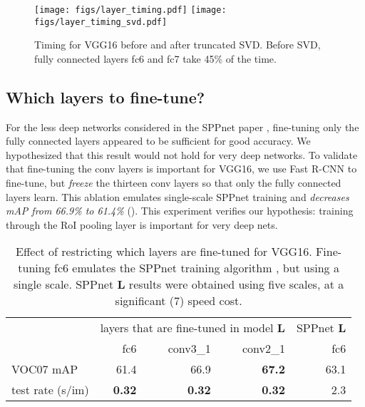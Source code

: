 \documentclass[10pt,twocolumn,letterpaper]{article}
\newcommand{\X}{\xspace}
\newcommand{\vggsixteen}{VGG16\xspace}
\newcommand{\roi}{RoI\xspace}
\newcommand{\Lg}{{\bf L}\xspace}
\begin{document}
\begin{figure}[h!]
\centering
\texttt{[image: figs/layer\_timing.pdf]}
\texttt{[image: figs/layer\_timing\_svd.pdf]}
\caption{Timing for \vggsixteen before and after truncated SVD.
Before SVD, fully connected layers fc6 and fc7 take 45\% of the time.}
\end{figure}



\subsection{Which layers to fine-tune?}
For the less deep networks considered in the SPPnet paper \cite{he2014spp}, fine-tuning only the fully connected layers appeared to be sufficient for good accuracy.
We hypothesized that this result would not hold for very deep networks.
To validate that fine-tuning the conv layers is important for \vggsixteen, we use Fast R-CNN to fine-tune, but \emph{freeze} the thirteen conv layers so that only the fully connected layers learn.
This ablation emulates single-scale SPPnet training and \emph{decreases mAP from 66.9\% to 61.4\%} ().
This experiment verifies our hypothesis: training through the \roi pooling layer is important for very deep nets.

\begin{table}[h!]
\begin{center}
\setlength{\tabcolsep}{3pt}
\renewcommand{\arraystretch}{1.1}
\small
\begin{tabular}{l|rrr|r}
  & \multicolumn{3}{c|}{layers that are fine-tuned in model \Lg} & SPPnet \Lg \\
  &  fc6 &  conv3\_1 &  conv2\_1 &  fc6 \\
\hline
VOC07 mAP & 61.4 & 66.9 & \bf{67.2} & 63.1 \\
test rate (s/im) & \bf{0.32} & \bf{0.32} & \bf{0.32} & 2.3 \\
\end{tabular}
\end{center}
\caption{Effect of restricting which layers are fine-tuned for \vggsixteen.
Fine-tuning  fc6 emulates the SPPnet training algorithm \cite{he2014spp}, but using a single scale.
SPPnet \Lg results were obtained using five scales, at a significant (7\X) speed cost.}
\vspace{-0.5em}
\end{table}
\end{document}
